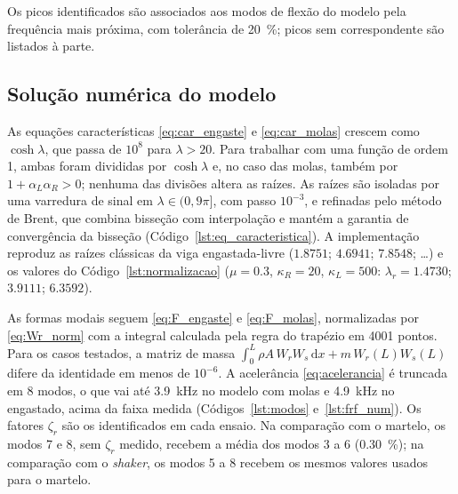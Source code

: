 Os picos identificados são associados aos modos de flexão do modelo pela frequência
mais próxima, com tolerância de \SI{20}{\percent}; picos sem correspondente são
listados à parte.

\subsection{Solução numérica do modelo}
\label{sec:met_modelo}

As equações características \eqref{eq:car_engaste} e \eqref{eq:car_molas} crescem
como $\cosh\lambda$, que passa de $10^{8}$ para $\lambda > 20$. Para trabalhar com uma
função de ordem 1, ambas foram divididas por $\cosh\lambda$ e, no caso das molas,
também por $1 + \alpha_L\alpha_R > 0$; nenhuma das divisões altera as raízes. As
raízes são isoladas por uma varredura de sinal em $\lambda \in (0, 9\pi]$, com passo
$10^{-3}$, e refinadas pelo método de Brent, que combina bisseção com interpolação e
mantém a garantia de convergência da bisseção (Código~\ref{lst:eq_caracteristica}).
A implementação reproduz as raízes clássicas da viga engastada-livre
($\num{1.8751}$; $\num{4.6941}$; $\num{7.8548}$; \dots) e os valores do
Código~\ref{lst:normalizacao} ($\mu = \num{0.3}$, $\kappa_R = 20$,
$\kappa_L = 500$: $\lambda_r = \num{1.4730}$; $\num{3.9111}$; $\num{6.3592}$).


As formas modais seguem \eqref{eq:F_engaste} e \eqref{eq:F_molas}, normalizadas por
\eqref{eq:Wr_norm} com a integral calculada pela regra do trapézio em 4001 pontos.
Para os casos testados, a matriz de massa
$\int_0^L \rho A\,W_rW_s\,\mathrm{d}x + m\,W_r(L)W_s(L)$ difere da identidade em menos
de $10^{-6}$. A acelerância \eqref{eq:acelerancia} é truncada em 8 modos, o que vai
até \SI{3.9}{\kilo\hertz} no modelo com molas e \SI{4.9}{\kilo\hertz} no engastado,
acima da faixa medida (Códigos~\ref{lst:modos} e~\ref{lst:frf_num}). Os fatores
$\zeta_r$ são os identificados em cada ensaio. Na comparação com o martelo, os modos 7
e 8, sem $\zeta_r$ medido, recebem a média dos modos 3 a 6 (\SI{0.30}{\percent}); na
comparação com o \emph{shaker}, os modos 5 a 8 recebem os mesmos valores usados para o
martelo.


